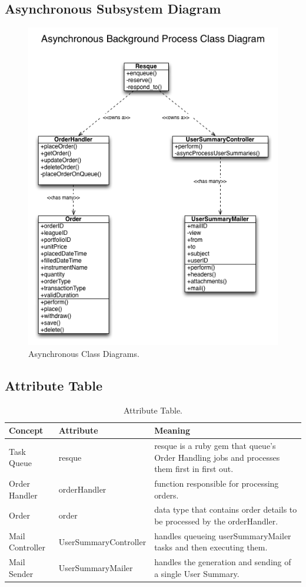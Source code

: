 \subsection{Asynchronous Subsystem Diagram}
\begin{figure}[H]
\centering
\includegraphics[width=5in]{./Diagrams/ClassDiagrams/cd.png}
\caption{ Asynchronous Class Diagrams.}
\end{figure}

\subsection{Attribute Table}
\begin{table}
\begin{tabular}{|p{3in}|p{3in}|p{3in}|}
\hline
Concept & Attribute & Meaning\\
\hline
Task Queue & resque & resque is a ruby gem that queue's Order Handling jobs and processes them first in first out.\\
\hline
Order Handler & orderHandler & function responsible for processing orders.\\
\hline
Order & order & data type that contains order details to be processed by the orderHandler.\\
\hline
Mail Controller & UserSummaryController & handles queueing userSummaryMailer tasks and then executing them.\\
\hline
Mail Sender & UserSummaryMailer & handles the generation and sending of a single User Summary.\\
\hline
\end{tabular}
\caption{ Attribute Table.}
\end{table}
